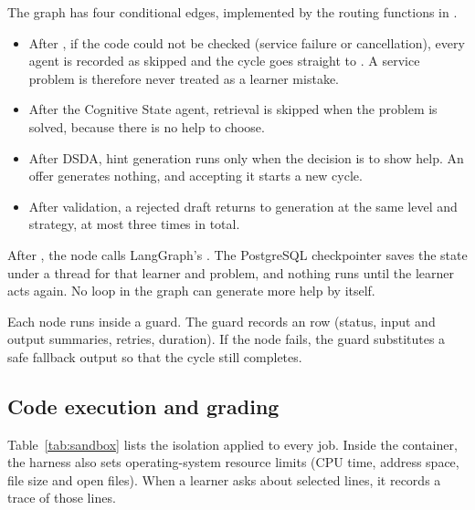 The graph has four conditional edges, implemented by the routing functions in .
\begin{itemize}
\item After , if the code could not be checked (service failure or cancellation), every agent is recorded as skipped and the cycle goes straight to . A service problem is therefore never treated as a learner mistake.
\item After the Cognitive State agent, retrieval is skipped when the problem is solved, because there is no help to choose.
\item After DSDA, hint generation runs only when the decision is to show help. An offer generates nothing, and accepting it starts a new cycle.
\item After validation, a rejected draft returns to generation at the same level and strategy, at most three times in total.
\end{itemize}
After , the  node calls LangGraph's . The PostgreSQL checkpointer saves the state under a thread for that learner and problem, and nothing runs until the learner acts again. No loop in the graph can generate more help by itself.

Each node runs inside a guard. The guard records an  row (status, input and output summaries, retries, duration). If the node fails, the guard substitutes a safe fallback output so that the cycle still completes.

\subsection{Code execution and grading}
Table~\ref{tab:sandbox} lists the isolation applied to every job. Inside the container, the harness also sets operating-system resource limits (CPU time, address space, file size and open files). When a learner asks about selected lines, it records a trace of those lines.

